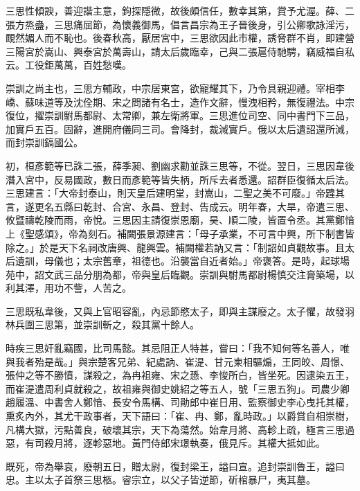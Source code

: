 \begin{pinyinscope}
 三思性傾諛，善迎諧主意，鉤探隱微，故後頗信任，數幸其第，賞予尤渥。薛、二張方烝蠱，三思痛屈節，為懷義御馬，倡言昌宗為王子晉後身，引公卿歌詠淫污，靦然媚人而不恥也。後春秋高，厭居宮中，三思欲因此市權，誘脅群不肖，即建營三陽宮於嵩山、興泰宮於萬壽山，請太后歲臨幸，己與二張扈侍馳騁，竊威福自私云。工役鉅萬萬，百姓愁嘆。



 崇訓之尚主也，三思方輔政，中宗居東宮，欲寵耀其下，乃令具親迎禮。宰相李嶠、蘇味道等及沈佺期、宋之問諸有名士，造作文辭，慢洩相矜，無復禮法。中宗復位，擢崇訓駙馬都尉、太常卿，兼左衛將軍。三思進位司空、同中書門下三品，加實戶五百。固辭，進開府儀同三司。會降封，裁減實戶。俄以太后遺詔還所減，而封崇訓鎬國公。



 初，桓彥範等已誅二張，薛季昶、劉幽求勸並誅三思等，不從。翌日，三思因韋後潛入宮中，反易國政，數日而彥範等皆失柄，所斥去者悉還。詔群臣復循太后法。三思建言：「大帝封泰山，則天皇后建明堂，封嵩山，二聖之美不可廢。」帝韙其言，遂更名五縣曰乾封、合宮、永昌、登封、告成云。明年春，大旱，帝遣三思、攸暨禱乾陵而雨，帝悅。三思因主請復崇恩廟，昊、順二陵，皆置令丞。其黨鄭愔上《聖感頌》，帝為刻石。補闕張景源建言：「母子承業，不可言中興，所下制書皆除之。」於是天下名祠改唐興、龍興雲。補闕權若訥又言：「制詔如貞觀故事。且太后遺訓，母儀也；太宗舊章，祖德也。沿襲當自近者始。」帝褒答。是時，起球場苑中，詔文武三品分朋為都，帝與皇后臨觀。崇訓與駙馬都尉楊慎交注膏築場，以利其澤，用功不訾，人苦之。



 三思既私韋後，又與上官昭容亂，內忌節愍太子，即與主謀廢之。太子懼，故發羽林兵圍三思第，並崇訓斬之，殺其黨十餘人。



 時疾三思奸亂竊國，比司馬懿。其忌阻正人特甚，嘗曰：「我不知何等名善人，唯與我者殆是哉。」與宗楚客兄弟、紀處訥、崔湜、甘元柬相驅煽，王同皎、周憬、張仲之等不勝憤，謀殺之，為冉祖雍、宋之愻、李悛所白，皆坐死。因逮染五王，而崔湜遣周利貞就殺之，故祖雍與御史姚紹之等五人，號「三思五狗」。司農少卿趙履溫、中書舍人鄭愔、長安令馬構、司勛郎中崔日用、監察御史李心曳托其權，熏炙內外，其尤干政事者，天下語曰：「崔、冉、鄭，亂時政。」以爵賞自相崇樹，凡構大獄，污點善良，破壞其宗，天下為蕩然。始韋月將、高軫上疏，極言三思過惡，有司殺月將，逐軫惡地。黃門侍郎宋璟執奏，俄見斥。其權大抵如此。



 既死，帝為舉哀，廢朝五日，贈太尉，復封梁王，謚曰宣。追封崇訓魯王，謚曰忠。主以太子首祭三思柩。睿宗立，以父子皆逆節，斫棺暴尸，夷其墓。




\end{pinyinscope}

